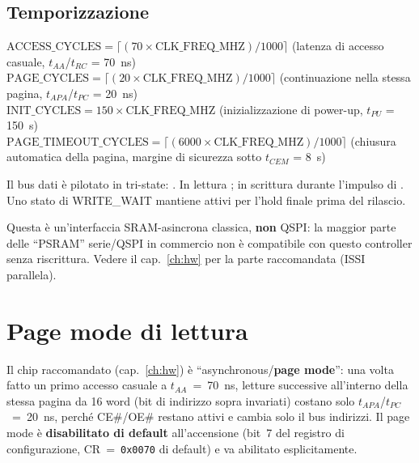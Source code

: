 \subsection{Temporizzazione}
\begin{fnspec}
$\text{ACCESS\_CYCLES}=\lceil (70\times \text{CLK\_FREQ\_MHZ})/1000\rceil$ \quad
(latenza di accesso casuale, $t_{AA}$/$t_{RC}$ = 70~ns)\\[3pt]
$\text{PAGE\_CYCLES}=\lceil (20\times \text{CLK\_FREQ\_MHZ})/1000\rceil$ \quad
(continuazione nella stessa pagina, $t_{APA}$/$t_{PC}$ = 20~ns)\\[3pt]
$\text{INIT\_CYCLES}=150\times \text{CLK\_FREQ\_MHZ}$ \quad
(inizializzazione di power-up, $t_{PU}$ = 150~\textmu s)\\[3pt]
$\text{PAGE\_TIMEOUT\_CYCLES}=\lceil (6000\times \text{CLK\_FREQ\_MHZ})/1000\rceil$ \quad
(chiusura automatica della pagina, margine di sicurezza sotto $t_{CEM}$ = 8~\textmu s)
\end{fnspec}
Il bus dati è pilotato in tri-state: . In lettura
; in scrittura  durante l'impulso di . Uno
stato di WRITE\_WAIT mantiene attivi  per l'hold finale prima
del rilascio.

\begin{fnwarn}
Questa è un'interfaccia SRAM-asincrona classica, \textbf{non} QSPI: la maggior parte
delle ``PSRAM'' serie/QSPI in commercio non è compatibile con questo controller senza
riscrittura. Vedere il cap.~\ref{ch:hw} per la parte raccomandata (ISSI parallela).
\end{fnwarn}

\section{Page mode di lettura}
\label{sec:pagemode}
Il chip raccomandato (cap.~\ref{ch:hw}) è ``asynchronous/\textbf{page mode}'': una
volta fatto un primo accesso casuale a $t_{AA}$~=~70~ns, letture successive
all'interno della stessa pagina da 16 word (bit di indirizzo sopra 
invariati) costano solo $t_{APA}$/$t_{PC}$~=~20~ns, perché CE\#/OE\# restano attivi
e cambia solo il bus indirizzi. Il page mode è \textbf{disabilitato di default}
all'accensione (bit~7 del registro di configurazione, CR~=~\texttt{0x0070} di
default) e va abilitato esplicitamente.

